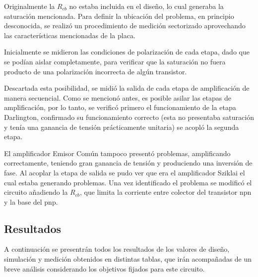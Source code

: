 Originalmente la $R_{cb}$ no estaba incluida en el diseño, lo cual generaba la saturación mencionada. Para definir la ubicación del problema, en principio desconocida, se realizó un procedimiento de medición sectorizado aprovechando las características mencionadas de la placa.

Inicialmente se midieron las condiciones de polarización de cada etapa, dado que se podían aislar completamente, para verificar que la saturación no fuera producto de una polarización incorrecta de algún transistor. 

Descartada esta posibilidad, se midió la salida de cada etapa de amplificación de manera secuencial. Como se mencionó antes, es posible asilar las etapas de amplificación, por lo tanto, se verificó primero el funcionamiento de la etapa Darlington, confirmado su funcionamiento correcto (esta no presentaba saturación y tenía una ganancia de tensión prácticamente unitaria) se acopló la segunda etapa.

El amplificador Emisor Común tampoco presentó problemas, amplificando correctamente, teniendo gran ganancia de tensión y produciendo una inversión de fase. Al acoplar la etapa de salida se pudo ver que era el amplificador Sziklai el cual estaba generando problemas.
Una vez identificado el problema se modificó el circuito añadiendo la $R_{cb}$, que limita la corriente entre colector del transistor npn y la base del pnp.

\subsection{Resultados}

A continuación se presentrán todos los resultados de los valores de diseño, simulación y medición obtenidos en distintas tablas, que irán acompañadas de un breve análisis considerando los objetivos fijados para este circuito.

